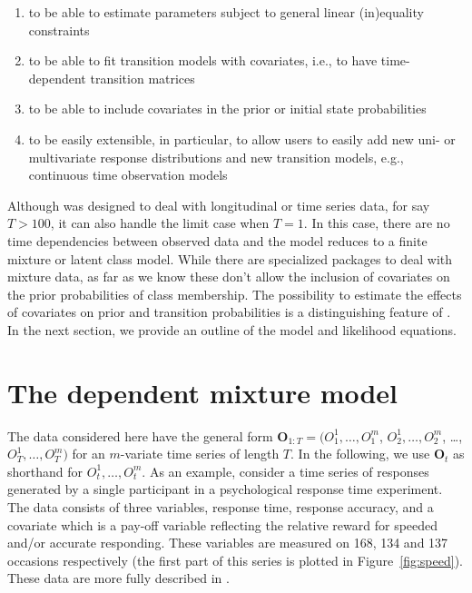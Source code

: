 \documentclass[article]{jss}
\newcommand{\vc}{\mathbf}
\begin{document}
\begin{enumerate}
	
	\item to be able to estimate parameters subject to general
	linear (in)equality constraints
	
	\item to be able to fit transition models with covariates, i.e.,
	to have time-dependent transition matrices
	
	\item to be able to include covariates in the prior or initial
	state probabilities
	
	\item to be easily extensible, in particular, to allow users to
	easily add new uni- or multivariate response distributions and
	new transition models, e.g., continuous time observation models
	
\end{enumerate}

Although  was designed to deal with longitudinal or time
series data, for say $T>100$, it can also handle the limit case when
$T=1$.  In this case, there are no time dependencies between observed
data and the model reduces to a finite mixture or latent class model.
While there are specialized packages to deal with mixture data, as far
as we know these don't allow the inclusion of covariates on the prior
probabilities of class membership.  The possibility to estimate the
effects of covariates on prior and transition probabilities is a
distinguishing feature of .  In the next section, we
provide an outline of the model and likelihood equations.


\section{The dependent mixture model}

The data considered here have the general form $\vc{O}_{1:T}=
(O_{1}^{1}, \ldots, O_{1}^{m}$, $O_{2}^{1}, \ldots, O_{2}^{m}$,
\ldots, $O_{T}^{1}, \ldots, O_{T}^{m})$ for an $m$-variate time series
of length $T$.  In the following, we use $\vc{O}_{t}$ as shorthand for
$O_{t}^{1}, \ldots, O_{t}^{m}$.  As an example, consider a time series
of responses generated by a single participant in a psychological
response time experiment.  The data consists of three variables,
response time, response accuracy, and a covariate which is a pay-off
variable reflecting the relative reward for speeded and/or accurate
responding.  These variables are measured on 168, 134 and 137
occasions respectively (the first part of this series is plotted in
Figure~\ref{fig:speed}).  These data are more fully described in
\citet{Dutilh2009}.
\end{document}
